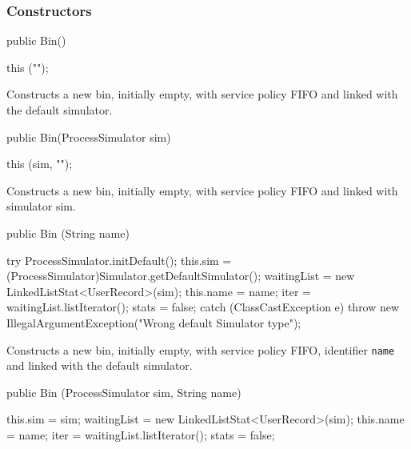 \subsubsection* {Constructors}
\begin{code}

   public Bin() \begin{hide} {
      this ("");
   }\end{hide}
\end{code}
 \begin{tabb}  Constructs a new bin, initially empty, with
   service policy FIFO and linked with the default simulator.
 \end{tabb}
\begin{code}

   public Bin(ProcessSimulator sim) \begin{hide} {
      this (sim, "");
   }\end{hide}
\end{code}
 \begin{tabb}  Constructs a new bin, initially empty, with
   service policy FIFO and linked with simulator sim.
 \end{tabb}
\begin{htmlonly}
\end{htmlonly}
\begin{code}

   public Bin (String name) \begin{hide} {
      try {
         ProcessSimulator.initDefault();
         this.sim = (ProcessSimulator)Simulator.getDefaultSimulator();
         waitingList = new LinkedListStat<UserRecord>(sim);
         this.name = name;
         iter = waitingList.listIterator();
         stats = false;
      }
      catch (ClassCastException e) {
         throw new IllegalArgumentException("Wrong default Simulator type");
      }
   }\end{hide}
\end{code}
 \begin{tabb}  Constructs a new bin, initially empty, with service policy FIFO,
  identifier \texttt{name} and linked with the default simulator.
 \end{tabb}
\begin{htmlonly}
\end{htmlonly}
\begin{code}

   public Bin (ProcessSimulator sim, String name) \begin{hide} {
      this.sim = sim;
      waitingList = new LinkedListStat<UserRecord>(sim);
      this.name = name;
      iter = waitingList.listIterator();
      stats = false;
   }\end{hide}
\end{code}
